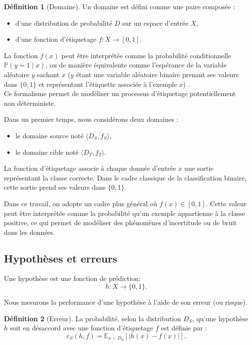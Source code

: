 \documentclass[a4paper,12pt]{article}
\theoremstyle{definition}
\newtheorem{definition}{Définition}[section]
\theoremstyle{remark}
\begin{document}
\begin{definition}[Domaine]
Un domaine est défini comme une paire composée :
\begin{itemize}
\item d’une distribution de probabilité $D$ sur un espace d’entrée $X$,
\item d’une fonction d’étiquetage $f : X \rightarrow [0,1]$.
\end{itemize}

La fonction $f(x)$ peut être interprétée comme la probabilité conditionnelle
$\displaystyle \mathbb{P}(y = 1 \mid x)$, ou de manière équivalente comme l’espérance de la
variable aléatoire $y$ sachant $x$ ($y$ étant une variable aléatoire binaire prenant ses valeurs dans $\{0,1\}$ et représentant l’étiquette associée à l’exemple $x$)
.\\
Ce formalisme permet de modéliser un processus
d’étiquetage potentiellement non déterministe.

Dans un premier temps, nous considérons deux domaines :
\begin{itemize}
\item le domaine source noté $\langle D_S, f_S \rangle$,
\item le domaine cible noté $\langle D_T, f_T \rangle$.
\end{itemize}
\end{definition}

La fonction d’étiquetage associe à chaque donnée d’entrée $x$ une sortie représentant
la classe correcte. Dans le cadre classique de la classification binaire, cette sortie
prend ses valeurs dans $\{0,1\}$.

Dans ce travail, on adopte un cadre plus général où $f(x) \in [0,1]$.
Cette valeur peut être interprétée comme la probabilité qu’un exemple appartienne
à la classe positive, ce qui permet de modéliser des phénomènes d’incertitude ou
de bruit dans les données.

\subsection{Hypothèses et erreurs}

Une hypothèse est une fonction de prédiction:  
\[
h : X \rightarrow \{0,1\}.
\]

Nous mesurons la performance d’une hypothèse à l’aide de son erreur (ou risque).

\begin{definition}[Erreur]
La probabilité, selon la distribution $D_S$, qu’une hypothèse $h$ soit en désaccord avec une fonction d’étiquetage $f$ est définie par :
\[
\varepsilon_S(h,f) = \mathbb{E}_{x \sim D_S}[|h(x) - f(x)|].
\]


\end{definition}
\end{document}
